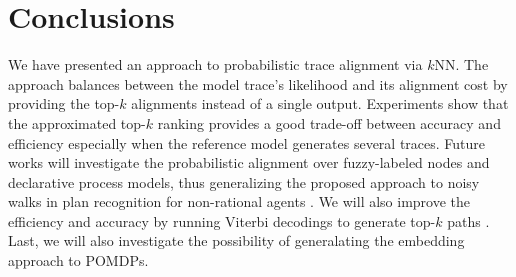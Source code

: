 
\section{Conclusions}
\label{sec:conclusion}

We have presented an approach to probabilistic trace alignment via $k$NN.
The approach balances between the model trace's likelihood  and its alignment cost by providing the top-$k$ 
alignments instead of a single output. Experiments show that the approximated top-$k$ ranking provides a good 
trade-off between accuracy and efficiency especially when the reference model generates several traces.
Future works will investigate the probabilistic alignment over fuzzy-labeled nodes and declarative process models, thus 
generalizing the proposed approach to noisy walks in plan recognition for non-rational agents \cite{RamirezG10}. We will also improve 
the efficiency and accuracy by %
running  Viterbi decodings to generate top-$k$ paths \cite{577040}. Last, we will also 
investigate the possibility of generalating the embedding approach to POMDPs.

